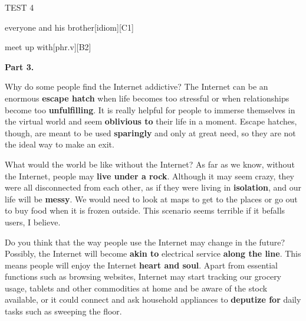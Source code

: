 \begin{glossarymc}[Cambridge 13]
\begin{test}{TEST 4}
\begin{VocabExplain}[Part 2]
            \begin{ExplainCard}{everyone and his brother}[idiom][C1]
            \end{ExplainCard}

            \begin{ExplainCard}{meet up with}[phr.v][B2]
            \end{ExplainCard}
        \end{VocabExplain}

    \noindent
    \textbf{Part 3.}
    \begin{qa}{Why do some people find the Internet addictive?}
    The Internet can be an enormous \textbf{escape hatch} when life becomes too stressful or when relationships become too \textbf{unfulfilling}. It is really helpful for people to immerse themselves in the virtual world and seem \textbf{oblivious to} their life in a moment. Escape hatches, though, are meant to be used \textbf{sparingly} and only at great need, so they are not the ideal way to make an exit.
    \end{qa}

    \begin{qa}{What would the world be like without the Internet?}
    As far as we know, without the Internet, people may \textbf{live under a rock}. Although it may seem crazy, they were all disconnected from each other, as if they were living in \textbf{isolation}, and our life will be \textbf{messy}. We would need to look at maps to get to the places or go out to buy food when it is frozen outside. This scenario seems terrible if it befalls users, I believe.
    \end{qa}

    \begin{qa}{Do you think that the way people use the Internet may change in the future?}
    Possibly, the Internet will become \textbf{akin to} electrical service \textbf{along the line}. This means people will enjoy the Internet \textbf{heart and soul}. Apart from essential functions such as browsing websites, Internet may start tracking our grocery usage, tablets and other commodities at home and be aware of the stock available, or it could connect and ask household appliances to \textbf{deputize for} daily tasks such as sweeping the floor.
    \end{qa}


\end{test}
\end{glossarymc}
